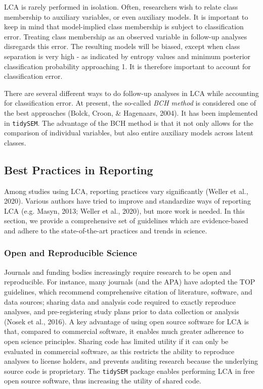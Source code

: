 \documentclass[
  ,man,floatsintext]{apa6}
\begin{document}
LCA is rarely performed in isolation.
Often, researchers wish to relate class membership to auxiliary variables, or even auxiliary models.
It is important to keep in mind that model-implied class membership is subject to classification error.
Treating class membership as an observed variable in follow-up analyses disregards this error.
The resulting models will be biased, except when class separation is very high
- as indicated by entropy values and minimum posterior classification probability approaching 1.
It is therefore important to account for classification error.

There are several different ways to do follow-up analyses in LCA while accounting for classification error.
At present, the so-called \emph{BCH method} is considered one of the best approaches (Bolck, Croon, \& Hagenaars, 2004).
It has been implemented in \texttt{tidySEM}. The advantage of the BCH method is that it not only allows for the comparison of individual variables,
but also entire auxiliary models across latent classes.

\hypertarget{best-practices-in-reporting}{%
\subsection{Best Practices in Reporting}\label{best-practices-in-reporting}}

Among studies using LCA, reporting practices vary significantly
(Weller et al., 2020).
Various authors have tried to improve and
standardize ways of reporting LCA (e.g. Masyn, 2013; Weller et al., 2020), but more work is needed.
In this section, we provide a comprehensive set of guidelines which are evidence-based and
adhere to the state-of-the-art practices and trends in science.

\hypertarget{open-and-reproducible-science}{%
\subsubsection{Open and Reproducible Science}\label{open-and-reproducible-science}}

Journals and funding bodies increasingly require research to be open and reproducible.
For instance, many journals (and the APA) have adopted the TOP guidelines, which recommend comprehensive citation of literature, software, and data sources;
sharing data and analysis code required to exactly reproduce analyses,
and pre-registering study plans prior to data collection or analysis (Nosek et al., 2016).
A key advantage of using open source software for LCA is that, compared to commercial software, it enables much greater adherence to open science principles.
Sharing code has limited utility if it can only be evaluated in commercial software,
as this restricts the ability to reproduce analyses to license holders,
and prevents auditing research because the underlying source code is proprietary.
The \texttt{tidySEM} package enables performing LCA in free open source software,
thus increasing the utility of shared code.
\end{document}
